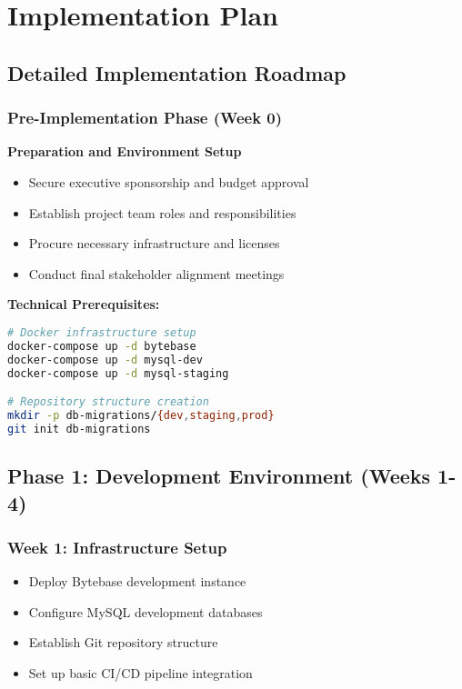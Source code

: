 \section{Implementation Plan}

\subsection{Detailed Implementation Roadmap}

\subsubsection{Pre-Implementation Phase (Week 0)}
\textbf{Preparation and Environment Setup}
\begin{itemize}
    \item Secure executive sponsorship and budget approval
    \item Establish project team roles and responsibilities
    \item Procure necessary infrastructure and licenses
    \item Conduct final stakeholder alignment meetings
\end{itemize}

\textbf{Technical Prerequisites:}
\begin{lstlisting}[language=bash, caption=Environment Preparation]
# Docker infrastructure setup
docker-compose up -d bytebase
docker-compose up -d mysql-dev
docker-compose up -d mysql-staging

# Repository structure creation
mkdir -p db-migrations/{dev,staging,prod}
git init db-migrations
\end{lstlisting}

\subsection{Phase 1: Development Environment (Weeks 1-4)}

\subsubsection{Week 1: Infrastructure Setup}
\begin{itemize}
    \item Deploy Bytebase development instance
    \item Configure MySQL development databases
    \item Establish Git repository structure
    \item Set up basic CI/CD pipeline integration
\end{itemize}

